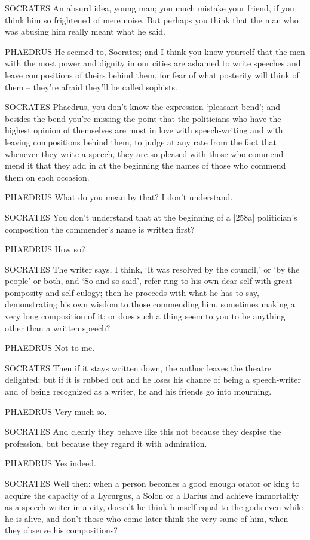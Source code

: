 SOCRATES An absurd idea, young man; you much mistake your 
friend, if you think him so frightened of mere noise. But perhaps you
think that the man who was abusing him really meant what he said.

PHAEDRUS He seemed to, Socrates; and I think you know  yourself
that the men with the most power and dignity in our cities are ashamed
to write speeches and leave compositions of theirs behind them, for fear
of what posterity will think of them -- they're afraid they'll be called
sophists.

SOCRATES Phaedrus, you don't know the expression ‘pleasant
bend'; and besides the
bend you're missing the point that the politicians who have the highest
opinion of themselves are most in love with speech-writing and with
leaving compositions behind them, to judge at any rate from the fact
that whenever they write a speech, they are so pleased with those who
commend  mend it that they add in at the beginning the names of
those who commend them on each occasion.

PHAEDRUS What do you mean by that? I don't understand.

SOCRATES You don't understand that at the beginning of a {[}258a{]}
politician's composition the commender's name is written first?

PHAEDRUS How so?

SOCRATES The writer says, I think, ‘It was resolved by the 
council,' or ‘by the people' or both, and ‘So-and-so said', refer-ring
to his own dear self with great pomposity and self-eulogy; then he
proceeds with what he has to say, demonstrating his own wisdom to those
commending him, sometimes making a very long composition of it; or does
such a thing seem to you to be anything other than a written speech?

 PHAEDRUS Not to me.

SOCRATES Then if it stays written down, the
author leaves the
theatre delighted; but if it is rubbed out and he loses his chance of
being a speech-writer and of being recognized as a  writer, he
and his friends go into mourning.

PHAEDRUS Very much so.

SOCRATES And clearly they behave like this not because they despise the
profession, but because they regard it with admiration.

PHAEDRUS Yes indeed.

 SOCRATES Well then: when a person becomes a good enough
 orator or king to acquire the capacity of a Lycurgus, a Solon
or a Darius and achieve
immortality as a speech-writer in a city, doesn't he think himself equal
to the gods even while he is alive, and don't those who come later think
the very same of  him, when they observe his compositions?


